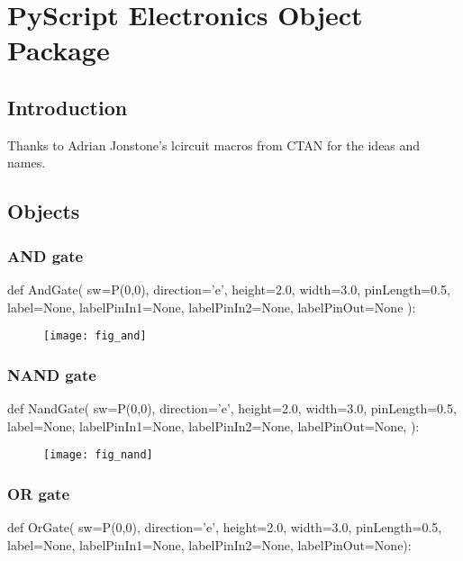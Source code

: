 \chapter{PyScript Electronics Object Package}

\section{Introduction}

Thanks to Adrian Jonstone's lcircuit macros from CTAN for the ideas
and names.

\section{Objects}

\subsection{AND gate}
\label{func:electronicsAnd}
\begin{python}
def AndGate(
    sw=P(0,0),
    direction='e',
    height=2.0,
    width=3.0,
    pinLength=0.5,
    label=None,
    labelPinIn1=None,
    labelPinIn2=None,
    labelPinOut=None
    ):
\end{python}

\begin{figure}[!h]
\centerline{\texttt{[image: fig\_and]}}
\end{figure}

\subsection{NAND gate}
\label{func:electronicsNand}
\begin{python}
def NandGate(
        sw=P(0,0),
        direction='e',
        height=2.0,
        width=3.0,
        pinLength=0.5,
        label=None,
        labelPinIn1=None,
        labelPinIn2=None,
        labelPinOut=None,
        ):
\end{python}

\begin{figure}[!h]
\centerline{\texttt{[image: fig\_nand]}}
\end{figure}

\subsection{OR gate}
\label{func:electronicsOr}
\begin{python}
def OrGate(
        sw=P(0,0),
        direction='e',
        height=2.0,
        width=3.0,
        pinLength=0.5,
        label=None,
        labelPinIn1=None,
        labelPinIn2=None,
        labelPinOut=None):
\end{python}


